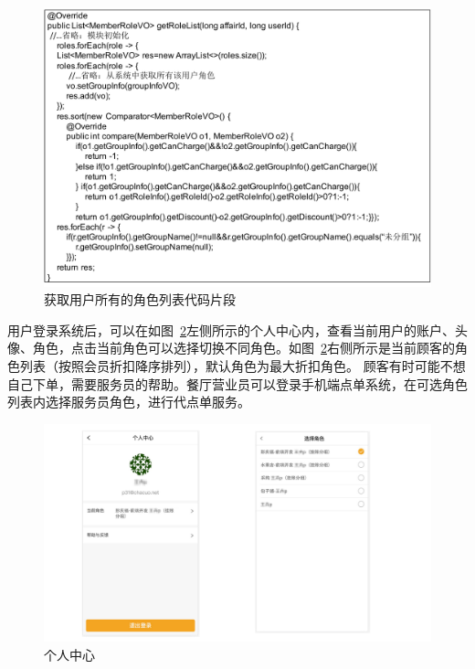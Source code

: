 \begin{figure}[htbp!]
    \centering
    \includegraphics[width=\linewidth]{FIGs/chapter4/5.pdf}
    \caption{获取用户所有的角色列表代码片段}\label{fig_user_5}
\end{figure}

用户登录系统后，可以在如图~\ref{fig_user_role_view}左侧所示的个人中心内，查看当前用户的账户、头像、角色，点击当前角色可以选择切换不同角色。如图~\ref{fig_user_role_view}右侧所示是当前顾客的角色列表（按照会员折扣降序排列），默认角色为最大折扣角色。
顾客有时可能不想自己下单，需要服务员的帮助。餐厅营业员可以登录手机端点单系统，在可选角色列表内选择服务员角色，进行代点单服务。

\begin{figure}[htbp!]
    \centering
    \includegraphics[width=\linewidth]{FIGs/chapter4/user_role_view.pdf}
    \caption{个人中心}\label{fig_user_role_view}
\end{figure}

